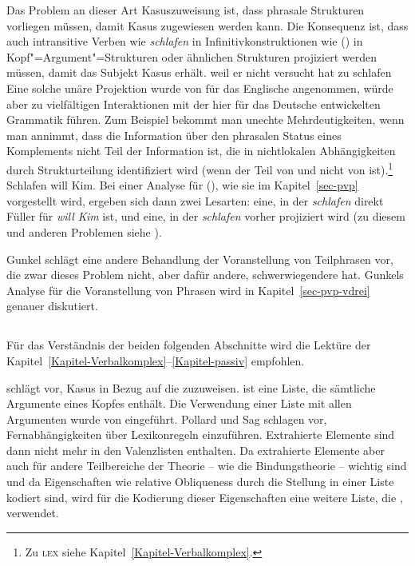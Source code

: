 Das Problem an dieser Art Kasuszuweisung ist, dass phrasale Strukturen vorliegen müssen,
damit Kasus zugewiesen werden kann. Die Konsequenz ist, dass auch intransitive Verben wie \emph{schlafen}
in Infinitivkonstruktionen wie () in Kopf"=Argument"=Strukturen oder ähnlichen Strukturen
projiziert werden müssen, damit das Subjekt Kasus erhält.
\ea
weil er nicht versucht hat zu schlafen
\z
Eine solche unäre Projektion wurde von \citet*[, Fn. 32]{ps2} für das Englische
angenommen, würde aber zu vielfältigen Interaktionen mit der hier für das Deutsche
entwickelten Grammatik führen. Zum Beispiel bekommt man unechte Mehrdeutigkeiten,
wenn man annimmt, dass die Information über den phrasalen Status eines Komplements 
nicht Teil der Information ist, die in nichtlokalen Abhängigkeiten durch Strukturteilung
identifiziert wird (wenn der \lexw{} Teil von \synsem und nicht von \HPSGloc ist).\footnote{
  Zu \textsc{lex} siehe Kapitel~\ref{Kapitel-Verbalkomplex}.%
}
\ea
Schlafen will Kim.
\z
Bei einer Analyse für (), wie sie im Kapitel~\ref{sec-pvp} vorgestellt wird, ergeben
sich dann zwei Lesarten: eine, in der \emph{schlafen} direkt Füller für \emph{will Kim}
ist, und eine, in der \emph{schlafen} vorher projiziert wird (zu diesem und anderen Problemen siehe
).

Gunkel schlägt eine andere Behandlung der Voranstellung von Teilphrasen vor, die
zwar dieses Problem nicht, aber dafür andere, schwerwiegendere hat. Gunkels Analyse
für die Voranstellung von Phrasen wird in Kapitel~\ref{sec-pvp-vdrei} genauer diskutiert.






\subsection{}
\label{kasus-adamp}

Für das Verständnis der beiden folgenden Abschnitte wird die Lektüre
der Kapitel~\ref{Kapitel-Verbalkomplex}--\ref{Kapitel-passiv} empfohlen.

\citet{Prze99} schlägt vor, Kasus in Bezug auf die \argstl zuzuweisen. \argst{} ist eine
Liste, die sämtliche Argumente eines Kopfes enthält. Die Verwendung einer
Liste mit allen Argumenten wurde von \citet[Kapitel~9]{ps2} eingeführt. Pollard
und Sag schlagen vor, Fernabhängigkeiten über Lexikonregeln einzuführen.
Extrahierte Elemente sind dann nicht mehr in den Valenzlisten enthalten.
Da extrahierte Elemente aber auch für andere Teilbereiche der Theorie -- wie \zb
die Bindungstheorie -- wichtig sind und da Eigenschaften wie
relative Obliqueness durch die Stellung in einer Liste kodiert sind, wird für die
Kodierung dieser Eigenschaften eine weitere Liste, die \argstl, verwendet.

